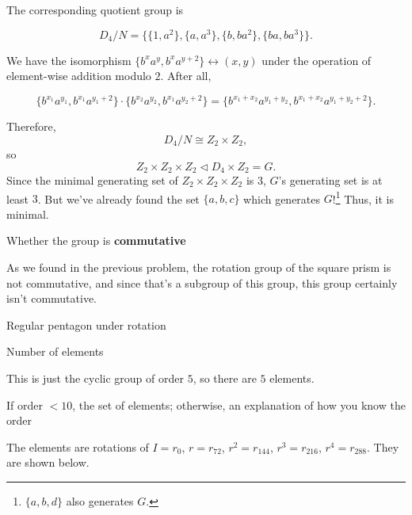 \documentclass[../gatm_answers.tex]{subfiles}
\begin{document}
\noindent The corresponding quotient group is

$$D_4/N = \{\{1,a^2\}, \{a,a^3\}, \{b,ba^2\}, \{ba, ba^3\}\}.$$

\noindent We have the isomorphism $\{b^xa^{y},b^xa^{y+2}\}\leftrightarrow (x,y)$ under the operation of element-wise addition modulo $2$. After all,

$$\{b^{x_1}a^{y_1},b^{x_1}a^{y_1+2}\}\cdot \{b^{x_2}a^{y_2},b^{x_1}a^{y_2+2}\} = \{b^{x_1+x_2}a^{y_1+y_2},b^{x_1+x_2}a^{y_1+y_2+2}\}.$$

\noindent Therefore, $$D_4/N \cong Z_2 \times Z_2,$$ so $$Z_2 \times Z_2 \times Z_2 \triangleleft D_4\times Z_2=G.$$ Since the minimal generating set of $Z_2\times Z_2\times Z_2$ is $3$, $G$'s generating set is at least $3$. But we've already found the set $\{a,b,c\}$ which generates $G$!\footnote{$\{a,b,d\}$ also generates $G$.} Thus, it is minimal.

\begin{inner_problem}
\item Whether the group is \textbf{commutative}
\end{inner_problem}

\noindent As we found in the previous problem, the rotation group of the square prism is not commutative, and since that's a subgroup of this group, this group certainly isn't commutative.

\begin{outer_problem}
\item Regular pentagon under rotation
\end{outer_problem}

\begin{inner_problem}[start=1]
\item Number of elements
\end{inner_problem}

\noindent This is just the cyclic group of order $5$, so there are $5$ elements.

\begin{inner_problem}
\item If order $< 10$, the set of elements; otherwise, an explanation of how you know the order
\end{inner_problem}

\noindent The elements are rotations of $I=r_0$, $r=r_{72}$, $r^2=r_{144}$, $r^3=r_{216}$, $r^4=r_{288}$. They are shown below.
\end{document}
